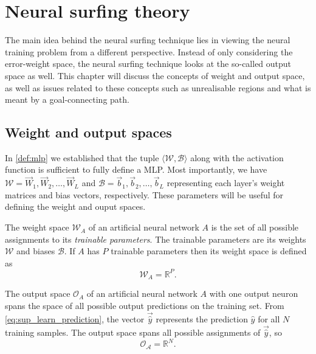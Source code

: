\chapter{Neural surfing theory}
\label{chap:neural_surfing_theory}
The main idea behind the neural surfing technique lies in viewing the neural training problem from a different perspective. 
Instead of only considering the error-weight space, the neural surfing technique looks at the so-called output space as well. 
This chapter will discuss the concepts of weight and output space, as well as issues related to these concepts such as unrealisable regions and what is meant by a goal-connecting path.

\section{Weight and output spaces}
\label{sec:weight_and_output_spaces}
In \ref{def:mlp} we established that the tuple $\langle \mathscr{W}, \mathscr{B} \rangle$ along with the activation function is sufficient to fully define a MLP. 
Most importantly, we have $\mathscr{W} = \vec{W}_1, \vec{W}_2, \dots, \vec{W}_L$ and $\mathscr{B} = \vec{b}_1, \vec{b}_2, \dots, \vec{b}_L$ representing each layer's weight matrices and bias vectors, respectively. 
These parameters will be useful for defining the weight and ouput spaces.

\begin{definition}
    \label{def:weight_space}
    The weight space $\mathcal{W}_A$ of an artificial neural network $A$ is the set of all possible assignments to its \textit{trainable parameters}. 
    The trainable parameters are its weights $\mathscr{W}$ and biases $\mathscr{B}$.
    If $A$ has $P$ trainable parameters then its weight space is defined as
    \begin{equation}
        \mathcal{W}_A = \mathbb{R}^P.
    \end{equation}
\end{definition}

\begin{definition}
    \label{def:output_space}
    The output space $\mathcal{O}_A$ of an artificial neural network $A$ with one output neuron spans the space of all possible output predictions on the training set.
    From \ref{eq:sup_learn_prediction}, the vector $\vec{\hat{y}}$ represents the prediction $\hat{y}$ for all $N$ training samples.
    The output space spans all possible assignments of $\vec{\hat{y}}$, so
    \begin{equation}
        \mathcal{O_A}=\mathbb{R}^N.
    \end{equation}
\end{definition}

